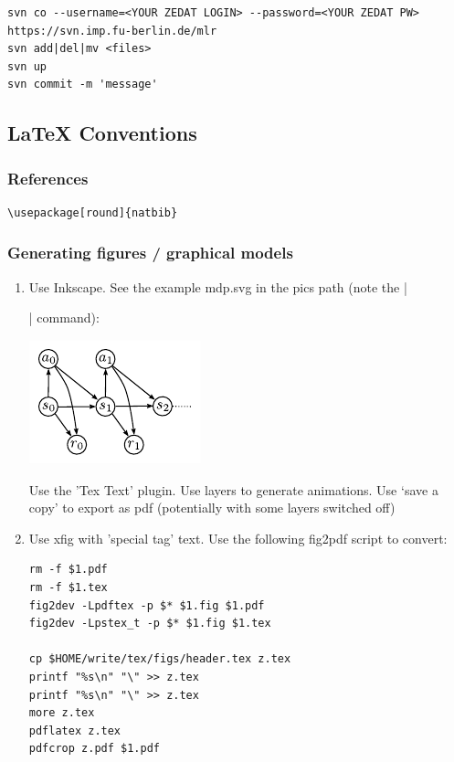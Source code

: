 \begin{code}
\begin{verbatim}
svn co --username=<YOUR ZEDAT LOGIN> --password=<YOUR ZEDAT PW> https://svn.imp.fu-berlin.de/mlr
svn add|del|mv <files>
svn up
svn commit -m 'message'
\end{verbatim}
\end{code}



\subsection{LaTeX Conventions}

\subsubsection{References}

\begin{code}
\begin{verbatim}
\usepackage[round]{natbib}

\end{verbatim}
\end{code}

\subsubsection{Generating figures / graphical models}

\begin{enumerate}

\item Use Inkscape. See the example mdp.svg in the pics path (note
the |\graphicspath{{pics/}}| command):

\centerline{\includegraphics[scale=.5]{mdp}}


  Use the 'Tex Text' plugin. Use layers to generate animations. Use
  `save a copy' to export as pdf (potentially with some layers
  switched off)

\item Use xfig with 'special tag' text. Use the following fig2pdf script to
  convert:

\begin{code}
\begin{verbatim}
rm -f $1.pdf
rm -f $1.tex
fig2dev -Lpdftex -p $* $1.fig $1.pdf
fig2dev -Lpstex_t -p $* $1.fig $1.tex

cp $HOME/write/tex/figs/header.tex z.tex
printf "%s\n" "\" >> z.tex
printf "%s\n" "\" >> z.tex
more z.tex
pdflatex z.tex
pdfcrop z.pdf $1.pdf
\end{verbatim}
\end{code}
\end{enumerate}



